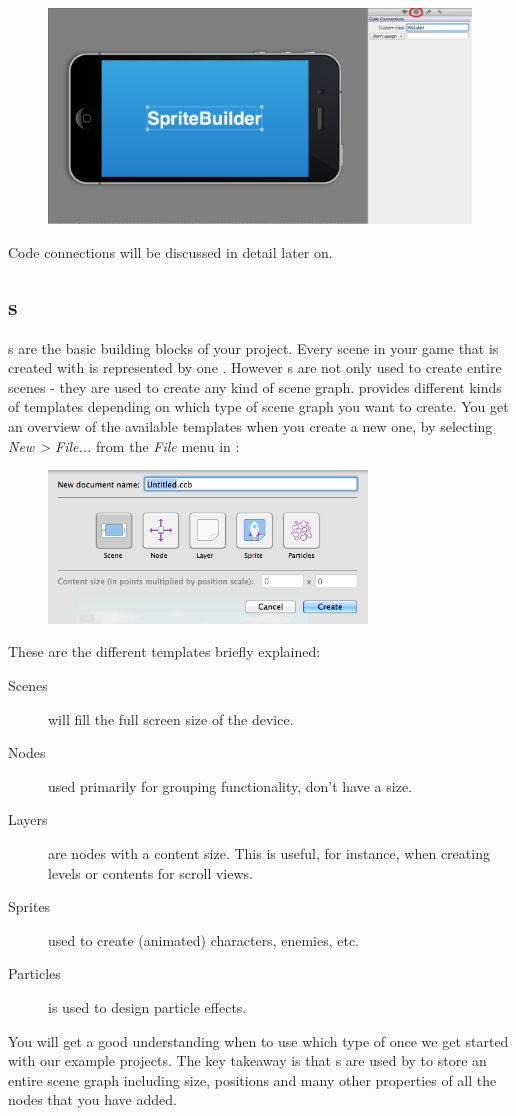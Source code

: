 \begin{figure}[H]
		\centering
		\includegraphics[width=0.8\linewidth]{images/spritebuilder/spritebuilder_codeconnections.png}     
\end{figure} 
Code connections will be discussed in detail later on.

\subsection{\ccbfile{}s}
\ccbfile{}s are the basic building blocks of your \SB{} project. Every scene in
your game that is created with \SB{} is represented by one \ccbfile{}. However
\ccbfile{}s are not only used to create entire scenes - they are used to create
any kind of scene graph. \SB{} provides different kinds of templates depending
on which type of scene graph you want to create. You get an overview of the
available \ccbfile{} templates when you create a new one, by selecting
\textit{New > File... } from the \textit{File} menu in \SB{}:
\begin{figure}[H]
		\centering
		\includegraphics[width=240pt]{images/spritebuilder/new-ccb.png}     
\end{figure} 
These are the different templates briefly explained:
\begin{description}
\item[Scenes] will fill the full screen size of the device.
\item[Nodes] used primarily for grouping functionality, don't have a size.
\item[Layers] are nodes with a content size. This is useful, for instance, when
creating levels or contents for scroll views.
\item[Sprites] used to create (animated) characters, enemies, etc.
\item[Particles] is used to design particle effects.
\end{description}
You will get a good understanding when to use which type of \ccbfile{} once we
get started with our example projects. The key takeaway is that \ccbfile{}s are
used by \SB{} to store an entire scene graph including size, positions and many
other properties of all the nodes that you have added.

